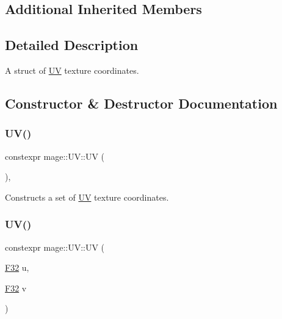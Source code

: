 \subsection*{Additional Inherited Members}


\subsection{Detailed Description}
A struct of \mbox{\hyperlink{structmage_1_1_u_v}{UV}} texture coordinates. 

\subsection{Constructor \& Destructor Documentation}
\mbox{\label{structmage_1_1_u_v_adc1ec1943378b391e1eeba840070b62c}} 
\subsubsection{\texorpdfstring{U\+V()}{UV()}\hspace{0.1cm}{\footnotesize\ttfamily [1/5]}}
{\footnotesize\ttfamily constexpr mage\+::\+U\+V\+::\+UV (\begin{DoxyParamCaption}{ }\end{DoxyParamCaption})\hspace{0.3cm}{\ttfamily [default]}, {\ttfamily [noexcept]}}

Constructs a set of \mbox{\hyperlink{structmage_1_1_u_v}{UV}} texture coordinates. \mbox{\label{structmage_1_1_u_v_a383d9dff35f65343ea90284a07581b1f}} 
\subsubsection{\texorpdfstring{U\+V()}{UV()}\hspace{0.1cm}{\footnotesize\ttfamily [2/5]}}
{\footnotesize\ttfamily constexpr mage\+::\+U\+V\+::\+UV (\begin{DoxyParamCaption}\item[{\mbox{\hyperlink{namespacemage_aa97e833b45f06d60a0a9c4fc22ae02c0}{F32}}}]{u,  }\item[{\mbox{\hyperlink{namespacemage_aa97e833b45f06d60a0a9c4fc22ae02c0}{F32}}}]{v }\end{DoxyParamCaption})\hspace{0.3cm}{\ttfamily [noexcept]}}

